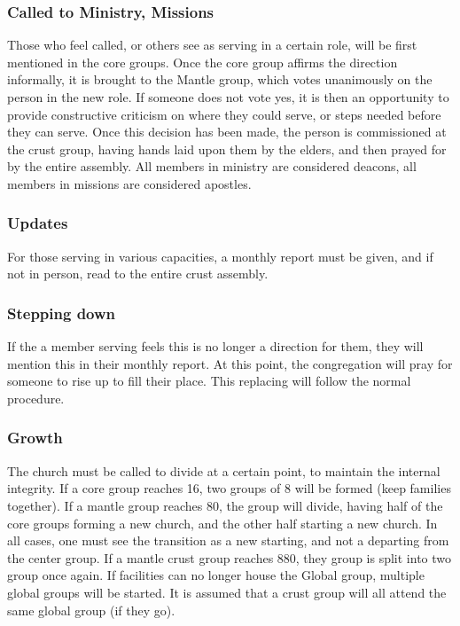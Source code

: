 \subsubsection{Called to Ministry, Missions}

Those who feel called, or others see as serving in a certain role, will be first mentioned in the core groups. Once the core group affirms the direction informally, it is brought to the Mantle group, which votes unanimously on the person in the new role. If someone does not vote yes, it is then an opportunity to provide constructive criticism on where they could serve, or steps needed before they can serve. Once this decision has been made, the person is commissioned at the crust group, having hands laid upon them by the elders, and then prayed for by the entire assembly. All members in ministry are considered deacons, all members in missions are considered apostles.



\subsubsection{Updates}

For those serving in various capacities, a monthly report must be given, and if not in person, read to the entire crust assembly.



\subsubsection{Stepping down}

If the a member serving feels this is no longer a direction for them, they will mention this in their monthly report. At this point, the congregation will pray for someone to rise up to fill their place. This replacing will follow the normal procedure.



\subsubsection{Growth}

The church must be called to divide at a certain point, to maintain the internal integrity. If a core group reaches 16, two groups of 8 will be formed (keep families together). If a mantle group reaches 80, the group will divide, having half of the core groups forming a new church, and the other half starting a new church. In all cases, one must see the transition as a new starting, and not a departing from the center group. If a mantle crust group reaches 880, they group is split into two group once again. If facilities can no longer house the Global group, multiple global groups will be started. It is assumed that a crust group will all attend the same global group (if they go).



